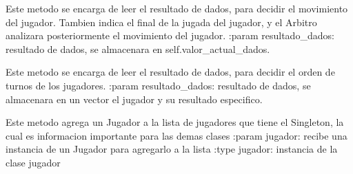 \documentclass[letterpaper,10pt,english]{sphinxmanual}
\begin{document}
\begin{fulllineitems}
\begin{fulllineitems}
\end{fulllineitems}


\begin{fulllineitems}
\label{\detokenize{codigo:arbitro.Arbitro.procesaRespuestaDados}}
Este metodo se encarga de leer el resultado de dados, para decidir el movimiento del jugador.
Tambien indica el final de la jugada del jugador, y el Arbitro analizara posteriormente el
movimiento del jugador.
:param resultado\_dados: resultado de dados, se almacenara en self.valor\_actual\_dados.

\end{fulllineitems}


\begin{fulllineitems}
\label{\detokenize{codigo:arbitro.Arbitro.reciboRespuestaDados}}
Este metodo se encarga de leer el resultado de dados, para decidir el orden de turnos 
de los jugadores.
:param resultado\_dados: resultado de dados, se almacenara en un vector el jugador y su
resultado especifico.

\end{fulllineitems}


\begin{fulllineitems}
\label{\detokenize{codigo:arbitro.Arbitro.reporte_jugadores}}
Este metodo agrega un Jugador a la lista de jugadores que tiene el Singleton, la cual es informacion importante para las demas clases
:param jugador: recibe una instancia de un Jugador para agregarlo a la lista
:type jugador: instancia de la clase jugador


\end{fulllineitems}
\end{fulllineitems}
\end{document}
